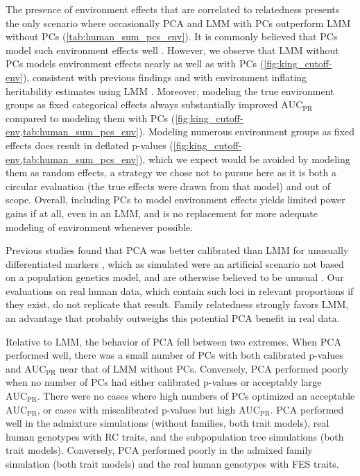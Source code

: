 \documentclass[11pt]{article}
\newcommand{\auc}{\text{AUC}_\text{PR}}
\begin{document}
\begin{linenumbers}
The presence of environment effects that are correlated to relatedness presents the only scenario where occasionally PCA and LMM with PCs outperform LMM without PCs (\cref{tab:human_sum_pcs_env}).
It is commonly believed that PCs model such environment effects well \citep{novembre_genes_2008, zhang_principal_2015, lin_admixed_2021}.
However, we observe that LMM without PCs models environment effects nearly as well as with PCs (\cref{fig:king_cutoff-env}), consistent with previous findings \citep{vilhjalmsson_nature_2013, wang_trade-offs_2022} and with environment inflating heritability estimates using LMM \citep{heckerman_linear_2016}.
Moreover, modeling the true environment groups as fixed categorical effects always substantially improved $\auc$ compared to modeling them with PCs (\cref{fig:king_cutoff-env,tab:human_sum_pcs_env}).
Modeling numerous environment groups as fixed effects does result in deflated p-values (\cref{fig:king_cutoff-env,tab:human_sum_pcs_env}), which we expect would be avoided by modeling them as random effects, a strategy we chose not to pursue here as it is both a circular evaluation (the true effects were drawn from that model) and out of scope.
Overall, including PCs to model environment effects yields limited power gains if at all, even in an LMM, and is no replacement for more adequate modeling of environment whenever possible.

Previous studies found that PCA was better calibrated than LMM for unusually differentiated markers \citep{price_new_2010, wu_comparison_2011, yang_advantages_2014}, which as simulated were an artificial scenario not based on a population genetics model, and are otherwise believed to be unusual \citep{sul_mixed_2013, price_response_2013}.
Our evaluations on real human data, which contain such loci in relevant proportions if they exist, do not replicate that result.
Family relatedness strongly favors LMM, an advantage that probably outweighs this potential PCA benefit in real data.

Relative to LMM, the behavior of PCA fell between two extremes.
When PCA performed well, there was a small number of PCs with both calibrated p-values and $\auc$ near that of LMM without PCs.
Conversely, PCA performed poorly when no number of PCs had either calibrated p-values or acceptably large $\auc$.
There were no cases where high numbers of PCs optimized an acceptable $\auc$, or cases with miscalibrated p-values but high $\auc$.
PCA performed well in the admixture simulations (without families, both trait models), real human genotypes with RC traits, and the subpopulation tree simulations (both trait models).
Conversely, PCA performed poorly in the admixed family simulation (both trait models) and the real human genotypes with FES traits.


\end{linenumbers}
\end{document}
